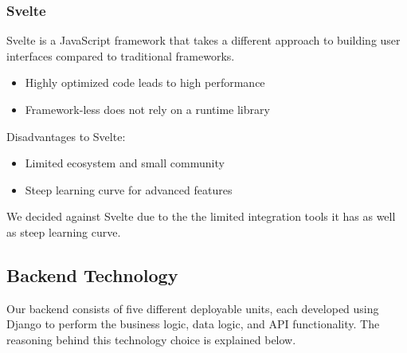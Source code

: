 \documentclass[12pt]{article}
\begin{document}
\subsubsection{Svelte}
Svelte is a JavaScript framework that takes a different approach to building user interfaces compared to traditional frameworks.
\begin{itemize}
    \item Highly optimized code leads to high performance
    \item Framework-less does not rely on a runtime library
\end{itemize}
Disadvantages to Svelte:
\begin{itemize}
    \item Limited ecosystem and small community
    \item Steep learning curve for advanced features
\end{itemize}
We decided against Svelte due to the the limited integration tools it has as well as steep learning curve.

\subsection{Backend Technology}

Our backend consists of five different deployable units, each developed using Django to perform the business logic, data logic, and API functionality. The reasoning behind this technology choice is explained below.
\end{document}
